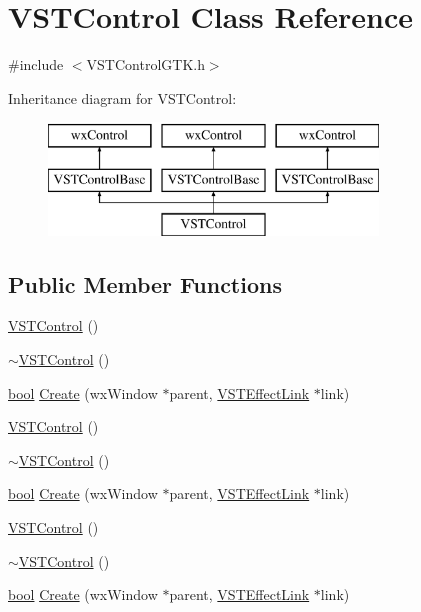 \hypertarget{class_v_s_t_control}{}\section{V\+S\+T\+Control Class Reference}
\label{class_v_s_t_control}


{\ttfamily \#include $<$V\+S\+T\+Control\+G\+T\+K.\+h$>$}

Inheritance diagram for V\+S\+T\+Control\+:\begin{figure}[H]
\begin{center}
\leavevmode
\includegraphics[height=3.000000cm]{class_v_s_t_control}
\end{center}
\end{figure}
\subsection*{Public Member Functions}
\begin{DoxyCompactItemize}
\item 
\hyperlink{class_v_s_t_control_a7fd3334df16326fb00e366bd10563f13}{V\+S\+T\+Control} ()
\item 
\hyperlink{class_v_s_t_control_a52a581055482537efd74afb5704dacca}{$\sim$\+V\+S\+T\+Control} ()
\item 
\hyperlink{mac_2config_2i386_2lib-src_2libsoxr_2soxr-config_8h_abb452686968e48b67397da5f97445f5b}{bool} \hyperlink{class_v_s_t_control_aca48f9ed4f5aa65e6e42e66630d04f1a}{Create} (wx\+Window $\ast$parent, \hyperlink{class_v_s_t_effect_link}{V\+S\+T\+Effect\+Link} $\ast$link)
\item 
\hyperlink{class_v_s_t_control_a7fd3334df16326fb00e366bd10563f13}{V\+S\+T\+Control} ()
\item 
\hyperlink{class_v_s_t_control_a52a581055482537efd74afb5704dacca}{$\sim$\+V\+S\+T\+Control} ()
\item 
\hyperlink{mac_2config_2i386_2lib-src_2libsoxr_2soxr-config_8h_abb452686968e48b67397da5f97445f5b}{bool} \hyperlink{class_v_s_t_control_aca48f9ed4f5aa65e6e42e66630d04f1a}{Create} (wx\+Window $\ast$parent, \hyperlink{class_v_s_t_effect_link}{V\+S\+T\+Effect\+Link} $\ast$link)
\item 
\hyperlink{class_v_s_t_control_a7fd3334df16326fb00e366bd10563f13}{V\+S\+T\+Control} ()
\item 
\hyperlink{class_v_s_t_control_a52a581055482537efd74afb5704dacca}{$\sim$\+V\+S\+T\+Control} ()
\item 
\hyperlink{mac_2config_2i386_2lib-src_2libsoxr_2soxr-config_8h_abb452686968e48b67397da5f97445f5b}{bool} \hyperlink{class_v_s_t_control_aca48f9ed4f5aa65e6e42e66630d04f1a}{Create} (wx\+Window $\ast$parent, \hyperlink{class_v_s_t_effect_link}{V\+S\+T\+Effect\+Link} $\ast$link)
\end{DoxyCompactItemize}
